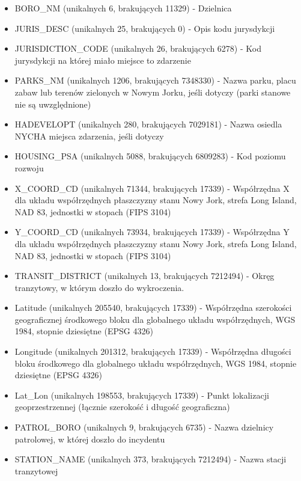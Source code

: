 \documentclass{classrep}
\begin{document}
{{\begin{enumerate}
\begin{itemize}
                    \item BORO\_NM (unikalnych 6, brakujących 11329) - Dzielnica
                    \item JURIS\_DESC (unikalnych 25, brakujących 0) - Opis kodu jurysdykcji
                    \item JURISDICTION\_CODE (unikalnych 26, brakujących 6278) - Kod jurysdykcji na której miało miejsce to zdarzenie
                    \item PARKS\_NM (unikalnych 1206, brakujących 7348330) - Nazwa parku, placu zabaw lub terenów zielonych w Nowym Jorku, jeśli dotyczy (parki stanowe nie są uwzględnione)
                    \item HADEVELOPT (unikalnych 280, brakujących 7029181) - Nazwa osiedla NYCHA miejsca zdarzenia, jeśli dotyczy
                    \item HOUSING\_PSA (unikalnych 5088, brakujących 6809283) - Kod poziomu rozwoju
                    \item X\_COORD\_CD (unikalnych 71344, brakujących 17339) - Współrzędna X dla układu współrzędnych płaszczyzny stanu Nowy Jork, strefa Long Island, NAD 83, jednostki w stopach (FIPS 3104)
                    \item Y\_COORD\_CD (unikalnych 73934, brakujących 17339) - Współrzędna Y dla układu współrzędnych płaszczyzny stanu Nowy Jork, strefa Long Island, NAD 83, jednostki w stopach (FIPS 3104)
                    \item TRANSIT\_DISTRICT (unikalnych 13, brakujących 7212494) - Okręg tranzytowy, w którym doszło do wykroczenia.
                    \item Latitude (unikalnych 205540, brakujących 17339) - Współrzędna szerokości geograficznej środkowego bloku dla globalnego układu współrzędnych, WGS 1984, stopnie dziesiętne (EPSG 4326)
                    \item Longitude (unikalnych 201312, brakujących 17339) - Współrzędna długości bloku środkowego dla globalnego układu współrzędnych, WGS 1984, stopnie dziesiętne (EPSG 4326)
                    \item Lat\_Lon (unikalnych 198553, brakujących 17339) - Punkt lokalizacji geoprzestrzennej (łącznie szerokość i długość geograficzna)
                    \item PATROL\_BORO (unikalnych 9, brakujących 6735) - Nazwa dzielnicy patrolowej, w której doszło do incydentu
                    \item STATION\_NAME (unikalnych 373, brakujących 7212494) - Nazwa stacji tranzytowej

\end{itemize}
\end{enumerate}}}
\end{document}
